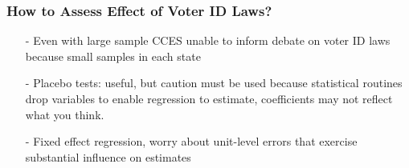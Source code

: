 \documentclass{beamer}
\numberwithin{equation}{section}
\begin{document}
\begin{frame}
\frametitle{How to Assess Effect of Voter ID Laws?}
\begin{itemize}
\item[-] Even with large sample CCES unable to inform debate on voter ID laws because small samples in each state
\item[-] Placebo tests: useful, but caution must be used because statistical routines drop variables to enable regression to estimate, coefficients may not reflect what you think.  
\item[-] Fixed effect regression, worry about unit-level errors that exercise substantial influence on estimates
\end{itemize}



\end{frame}
\end{document}
